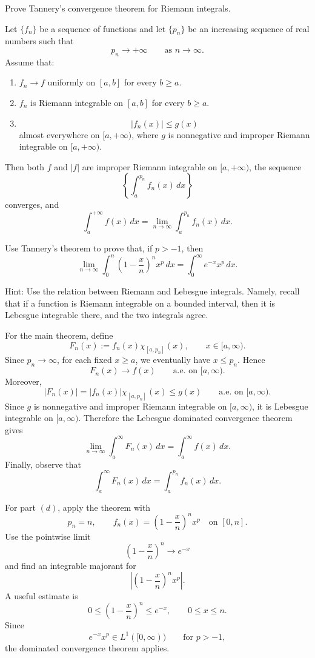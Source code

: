 \begin{problem}
    Prove Tannery's convergence theorem for Riemann integrals.

Let \(\{f_n\}\) be a sequence of functions and let \(\{p_n\}\) be an increasing
sequence of real numbers such that
\[
p_n \to +\infty \qquad \text{as } n\to\infty.
\]
Assume that:
\begin{enumerate}
\item[(a)] \(f_n \to f\) uniformly on \([a,b]\) for every \(b\ge a\).

\item[(b)] \(f_n\) is Riemann integrable on \([a,b]\) for every \(b\ge a\).

\item[(c)] 
\[
|f_n(x)|\le g(x)
\]
almost everywhere on \([a,+\infty)\), where \(g\) is nonnegative and improper
Riemann integrable on \([a,+\infty)\).
\end{enumerate}

Then both \(f\) and \(|f|\) are improper Riemann integrable on \([a,+\infty)\),
the sequence
\[
\left\{\int_a^{p_n} f_n(x)\,dx\right\}
\]
converges, and
\[
\int_a^{+\infty} f(x)\,dx
=
\lim_{n\to\infty}\int_a^{p_n} f_n(x)\,dx.
\]

\item[(d)] Use Tannery's theorem to prove that, if \(p>-1\), then
\[
\lim_{n\to\infty}\int_0^n \left(1-\frac{x}{n}\right)^n x^p\,dx
=
\int_0^\infty e^{-x}x^p\,dx .
\]


Hint:
Use the relation between Riemann and Lebesgue integrals.  Namely, recall that
if a function is Riemann integrable on a bounded interval, then it is Lebesgue
integrable there, and the two integrals agree.

For the main theorem, define
\[
F_n(x):=f_n(x)\chi_{[a,p_n]}(x), \qquad x\in [a,\infty).
\]
Since \(p_n\to\infty\), for each fixed \(x\ge a\), we eventually have
\(x\le p_n\). Hence
\[
F_n(x)\to f(x)
\qquad \text{a.e. on } [a,\infty).
\]
Moreover,
\[
|F_n(x)|
=
|f_n(x)|\chi_{[a,p_n]}(x)
\le g(x)
\qquad \text{a.e. on }[a,\infty).
\]
Since \(g\) is nonnegative and improper Riemann integrable on \([a,\infty)\),
it is Lebesgue integrable on \([a,\infty)\). Therefore the Lebesgue dominated
convergence theorem gives
\[
\lim_{n\to\infty}\int_a^\infty F_n(x)\,dx
=
\int_a^\infty f(x)\,dx.
\]
Finally, observe that
\[
\int_a^\infty F_n(x)\,dx
=
\int_a^{p_n} f_n(x)\,dx.
\]

For part \((d)\), apply the theorem with
\[
p_n=n,
\qquad
f_n(x)=\left(1-\frac{x}{n}\right)^n x^p
\quad \text{on }[0,n].
\]
Use the pointwise limit
\[
\left(1-\frac{x}{n}\right)^n\to e^{-x}
\]
and find an integrable majorant for
\[
\left|\left(1-\frac{x}{n}\right)^n x^p\right|.
\]
A useful estimate is
\[
0\le \left(1-\frac{x}{n}\right)^n\le e^{-x},
\qquad 0\le x\le n.
\]
Since
\[
e^{-x}x^p\in L^1([0,\infty))
\qquad \text{for } p>-1,
\]
the dominated convergence theorem applies.
\end{problem}

